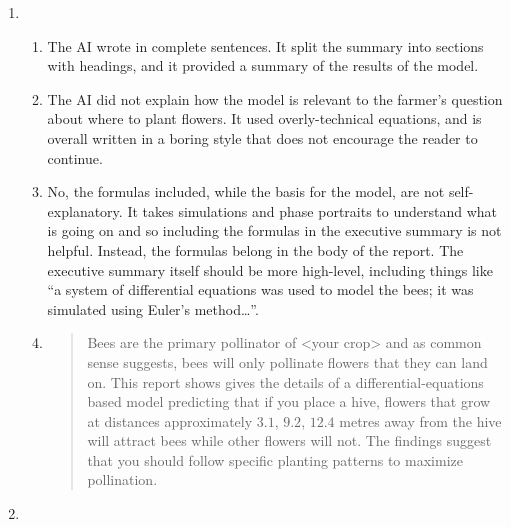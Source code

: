 \begin{enumerate}
\begin{enumerate}
            \item \begin{enumerate}
                \item The AI wrote in complete sentences. It split the summary into sections with headings, and it 
                provided a summary of the results of the model.
                \item The AI did not explain how the model is relevant to the farmer's question about where to plant flowers.
                It used overly-technical equations, and is overall written in a boring style that does not encourage the reader to continue.
                \item No, the formulas included, while the basis for the model, are not self-explanatory. It takes simulations and phase 
                portraits to understand what is going on and so including the formulas in the executive summary is not helpful. Instead,
                the formulas belong in the body of the report. The executive summary itself should be more high-level, including things like
                ``a system of differential equations was used to model the bees; it was simulated using Euler's method\ldots''.

                \item \phantom{x}\begin{quote}
                    Bees are the primary pollinator of <your crop> and as common sense suggests, bees will only pollinate flowers
                    that they can land on. This report shows gives the details of a differential-equations based model predicting
                    that if you place a hive, flowers that grow at distances approximately $3.1$, $9.2$, $12.4$ metres away from the hive
                    will attract bees while other flowers will not. The findings suggest that you should follow specific planting patterns
                    to maximize pollination.
                \end{quote}
            \end{enumerate}
        \item
        \end{enumerate}
		

\end{enumerate}